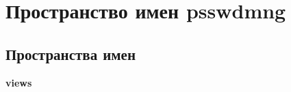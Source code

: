 \section{Пространство имен psswdmng}
\label{namespacepsswdmng}
\subsection*{Пространства имен}
\begin{DoxyCompactItemize}
\item 
 \textbf{ views}
\end{DoxyCompactItemize}
